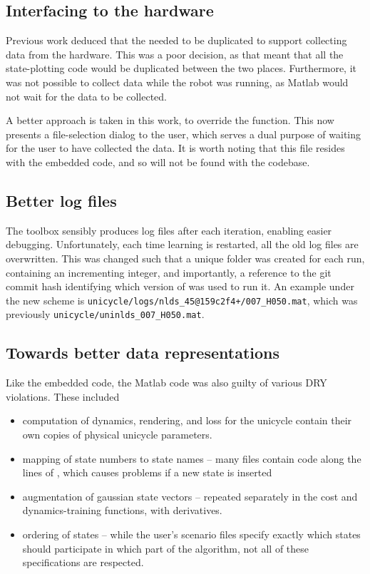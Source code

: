 \documentclass[main.tex]{subfiles}
\begin{document}
\subsection{Interfacing to the hardware}

	Previous work deduced that the  needed to be duplicated to support collecting data from the hardware.
	This was a poor decision, as that meant that all the state-plotting code would be duplicated between the two places.
	Furthermore, it was not possible to collect data while the robot was running, as Matlab would not wait for the data to be collected.

	A better approach is taken in this work, to override the  function.
	This now presents a file-selection dialog to the user, which serves a dual purpose of waiting for the user to have collected the data.
	It is worth noting that this file resides with the embedded code, and so will not be found with the {\Pilco} codebase.

\subsection{Better log files}

	The {\Pilco} toolbox sensibly produces log files after each iteration, enabling easier debugging.
	Unfortunately, each time learning is restarted, all the old log files are overwritten.
	This was changed such that a unique folder was created for each run, containing an incrementing integer, and importantly, a reference to the git commit hash identifying which version of {\Pilco} was used to run it. An example under the new scheme is \lstinline{unicycle/logs/nlds_45@159c2f4+/007_H050.mat}, which was previously \lstinline{unicycle/uninlds_007_H050.mat}.

\subsection{Towards better data representations}

	Like the embedded code, the Matlab code was also guilty of various DRY violations.
	These included
	\begin{itemize}[noitemsep]
		\item computation of dynamics, rendering, and loss for the unicycle contain their own copies of physical unicycle parameters.
		\item mapping of state numbers to state names -- many files contain code along the lines of , which causes problems if a new state is inserted
		\item augmentation of gaussian state vectors -- repeated separately in the cost and dynamics-training functions, with derivatives.
		\item ordering of states -- while the user's scenario files specify exactly which states should participate in which part of the algorithm, not all of these specifications are respected.
	\end{itemize}
\end{document}

